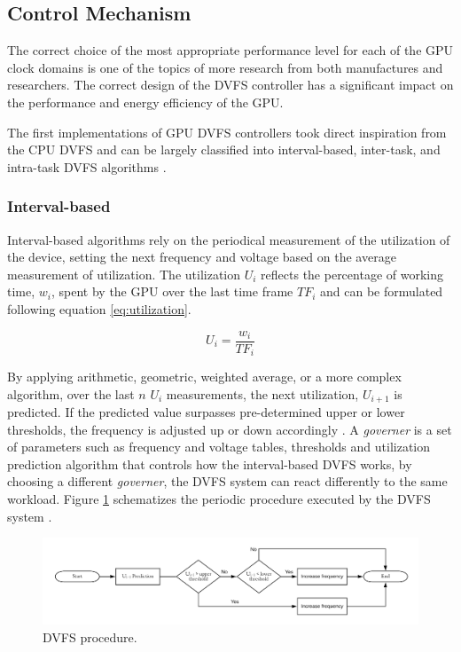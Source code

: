 \subsection{Control Mechanism}

The correct choice of the most appropriate performance level for each of the GPU clock domains is one of the topics of more research from both manufactures and researchers. The correct design of the DVFS controller has a significant impact on the performance and energy efficiency of the GPU.

The first implementations of GPU DVFS controllers took direct inspiration from the CPU DVFS and can be largely classified into interval-based, inter-task, and intra-task DVFS algorithms \cite{boyer_improving_2013}. 

\subsubsection{Interval-based}

Interval-based algorithms rely on the periodical measurement of the utilization of the device, setting the next frequency and voltage based on the average measurement of utilization. The utilization $U_{i}$ reflects the percentage of working time, $w_{i}$, spent by the GPU over the last time frame  $TF_{i}$ and can be formulated following equation \ref{eq:utilization}.

\begin{equation}
    U_i=\frac{w_i}{TF_i}
    \label{eq:utilization}
\end{equation}

By applying arithmetic, geometric, weighted average, or a more complex algorithm, over the last $n$ $U_{i}$ measurements,  the next utilization, $U_{i+1}$ is predicted. If the predicted value surpasses pre-determined upper or lower thresholds, the frequency is adjusted up or down accordingly \cite{seongki_gpgpu-perf:_nodate}. 
A \textit{governer} is a set of parameters such as frequency and voltage tables, thresholds and utilization prediction algorithm that controls how the interval-based DVFS works, by choosing a different \textit{governer}, the DVFS system can react differently to the same workload. Figure \ref{fig:DVFSprocedure} schematizes the periodic procedure executed by the DVFS system \cite{seongki_gpgpu-perf:_nodate}. 

\begin{figure}[!htb]
  \centering
  \includegraphics[width=1\textwidth]{Figures/StateArt/DVFSprogram.png}
  \caption[Controller]{DVFS procedure.}
  \label{fig:DVFSprocedure}
\end{figure}

